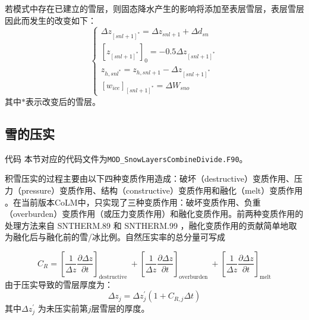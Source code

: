 若模式中存在已建立的雪层，则固态降水产生的影响将添加至表层雪层，表层雪层因此而发生的改变如下：
\begin{equation}
\left\{\begin{array}{c}\Delta z_{[{snl}+1]^{*}}=\Delta z_{{snl}+1}+\Delta {d}_{{sn}} \\ {\left[z_{[{snl}+1]^{*}}\right]_{0}=-0.5 \Delta z_{[{snl}+1]^{*}}} \\ z_{{h}, {snl}^{*}}=z_{{h}, {snl}+1}-\Delta z_{[{snl}+1]^{*}} \\ {\left[{w}_{{ice}}\right]_{[{snl}+1]^{*}}=\Delta {W}_{{sno}}}\end{array}\right.
\end{equation}
其中$\ast$表示改变后的雪层。


\subsection{雪的压实}
\begin{mymdframed}{代码}
本节对应的代码文件为\texttt{MOD\_SnowLayersCombineDivide.F90}。
\end{mymdframed}

积雪压实的过程主要由以下四种变质作用造成：破坏（destructive）变质作用、压力（pressure）变质作用、结构（constructive）变质作用和融化（melt）变质作用 \citep{yen1981review}。在当前版本CoLM中，只实现了三种变质作用：破坏变质作用、负重（overburden）变质作用（或压力变质作用）和融化变质作用。前两种变质作用的处理方法来自 SNTHERM.89 \citep{jordan1991one}和 SNTHERM.99 \citep{jordan1999heat}，融化变质作用的贡献简单地取为融化后与融化前的雪/冰比例。自然压实率的总分量可写成

\begin{equation}
{C}_{{R}}=\left[\frac{1}{\Delta {z}} \frac{\partial \Delta {z}}{\partial {t}}\right]_{\text {destructive }}+\left[\frac{1}{\Delta {z}} \frac{\partial \Delta {z}}{\partial {t}}\right]_{\text {overburden }}+\left[\frac{1}{\Delta {z}} \frac{\partial \Delta {z}}{\partial {t}}\right]_{\text{melt}}
\end{equation}
由于压实导致的雪层厚度为：
\begin{equation}
\Delta z_{j}=\Delta z_{j}^{\prime}\left(1+C_{R, j} \Delta t\right)
\end{equation}
其中$\Delta {z}_{{j}}^{\prime}$ 为未压实前第$j$层雪层的厚度。


